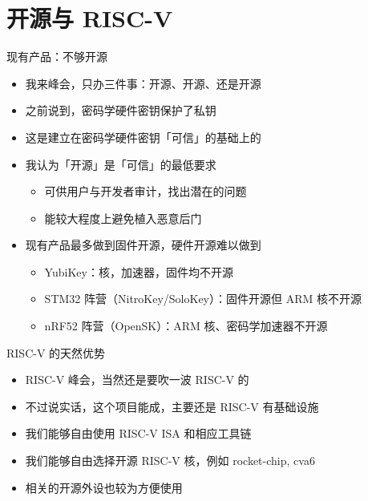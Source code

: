 \documentclass[aspectratio=169]{ctexbeamer}
\begin{document}

\section{开源与 RISC-V}

\begin{frame}{现有产品：不够开源}
  \begin{itemize}
    \item 我来峰会，只办三件事：开源、开源、还是开源
    \item 之前说到，密码学硬件密钥保护了私钥
    \item 这是建立在密码学硬件密钥「可信」的基础上的
    \item 我认为「开源」是「可信」的最低要求\begin{itemize}
      \item 可供用户与开发者审计，找出潜在的问题
      \item 能较大程度上避免植入恶意后门
    \end{itemize}
    \item<2> 现有产品最多做到固件开源，硬件开源难以做到\begin{itemize}
      \item YubiKey：核，加速器，固件均不开源
      \item STM32 阵营（NitroKey/SoloKey）：固件开源但 ARM 核不开源
      \item nRF52 阵营（OpenSK）：ARM 核、密码学加速器不开源
    \end{itemize}
  \end{itemize}
\end{frame}

\begin{frame}{RISC-V 的天然优势}
  \begin{itemize}
    \item RISC-V 峰会，当然还是要吹一波 RISC-V 的
    \item 不过说实话，这个项目能成，主要还是 RISC-V 有基础设施
    \item 我们能够自由使用 RISC-V ISA 和相应工具链
    \item 我们能够自由选择开源 RISC-V 核，例如 rocket-chip, cva6
    \item 相关的开源外设也较为方便使用
  \end{itemize}
\end{frame}
\end{document}
